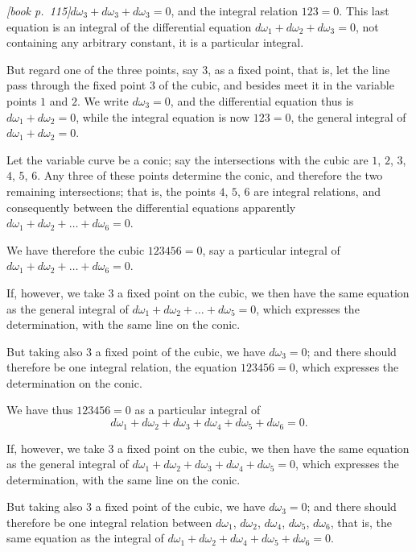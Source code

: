 \documentclass[11pt,a4paper]{article}
\theoremstyle{plain}
\theoremstyle{definition}
\theoremstyle{remark}
\begin{document}
\noindent\textit{[book p.~115]}\quad $d\omega_3 + d\omega_3 + d\omega_3 = 0$, and the integral relation $123 = 0$. This last equation is an integral of the differential equation $d\omega_1 + d\omega_2 + d\omega_3 = 0$, not containing any arbitrary constant, it is a particular integral.

But regard one of the three points, say $3$, as a fixed point, that is, let the line pass through the fixed point $3$ of the cubic, and besides meet it in the variable points $1$ and $2$. We write $d\omega_3 = 0$, and the differential equation thus is $d\omega_1 + d\omega_2 = 0$, while the integral equation is now $123 = 0$, the general integral of $d\omega_1 + d\omega_2 = 0$.

Let the variable curve be a conic; say the intersections with the cubic are $1$, $2$, $3$, $4$, $5$, $6$. Any three of these points determine the conic, and therefore the two remaining intersections; that is, the points $4$, $5$, $6$ are integral relations, and consequently between the differential equations apparently $d\omega_1 + d\omega_2 + \ldots + d\omega_6 = 0$.

We have therefore the cubic $123456 = 0$, say a particular integral of $d\omega_1 + d\omega_2 + \ldots + d\omega_6 = 0$.

If, however, we take $3$ a fixed point on the cubic, we then have the same equation as the general integral of $d\omega_1 + d\omega_2 + \ldots + d\omega_5 = 0$, which expresses the determination, with the same line on the conic.

But taking also $3$ a fixed point of the cubic, we have $d\omega_3 = 0$; and there should therefore be one integral relation, the equation $123456 = 0$, which expresses the determination on the conic.

We have thus $123456 = 0$ as a particular integral of
\[
d\omega_1 + d\omega_2 + d\omega_3 + d\omega_4 + d\omega_5 + d\omega_6 = 0.
\]

If, however, we take $3$ a fixed point on the cubic, we then have the same equation as the general integral of $d\omega_1 + d\omega_2 + d\omega_3 + d\omega_4 + d\omega_5 = 0$, which expresses the determination, with the same line on the conic.

But taking also $3$ a fixed point of the cubic, we have $d\omega_3 = 0$; and there should therefore be one integral relation between $d\omega_1$, $d\omega_2$, $d\omega_4$, $d\omega_5$, $d\omega_6$, that is, the same equation as the integral of $d\omega_1 + d\omega_2 + d\omega_4 + d\omega_5 + d\omega_6 = 0$.
\end{document}
